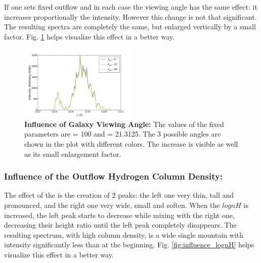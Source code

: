 \documentclass{latex/emulateapj}
\begin{document}
If one sets fixed outflow \vel and \lognh in each case the viewing angle has the same effect: it increases proportionally the intensity. However this change is not that significant. The resulting spectra are completely the same, but enlarged vertically by a small factor. Fig. \ref{fig:influence_ang} helps visualize this effect in a better way.

\begin{figure}[h!]
\begin{center}
  \includegraphics[width=0.5\textwidth]{./figures/influence_ang.png}
\end{center}
\caption{\textbf{Influence of Galaxy Viewing Angle:} The values of the fixed parameters are \vel = 100 \kms and \lognh = 21.3125. The 3 possible angles are shown in the plot with different colors. The increase is visible as well as its small enlargement factor.\\
\label{fig:influence_ang}}
\end{figure}

\subsubsection{Influence of the Outflow Hydrogen Column Density: \lognh }

The effect of the \lognh is the creation of 2 peaks: the left one very thin, tall and pronounced, and the right one very wide, small and soften. When the $log{nH}$ is increased, the left peak starts to decrease while mixing with the right one, decreasing their height ratio until the left peak completely disappears. The resulting spectrum, with high column density, is a wide single mountain with intensity significantly less than at the beginning. Fig. \ref{fig:influence_lognH} helps visualize this effect in a better way.
\end{document}
